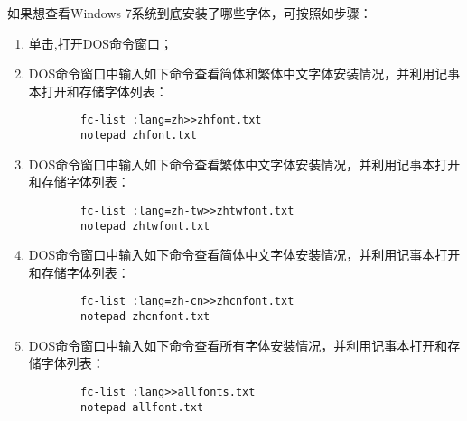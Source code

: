 如果想查看Windows 7系统到底安装了哪些字体，可按照如步骤：
\begin{enumerate}
	\item 单击,打开DOS命令窗口；
	\item DOS命令窗口中输入如下命令查看简体和繁体中文字体安装情况，并利用记事本打开和存储字体列表：
	\begin{lstlisting}
		fc-list :lang=zh>>zhfont.txt
		notepad zhfont.txt
	\end{lstlisting}
	\item DOS命令窗口中输入如下命令查看繁体中文字体安装情况，并利用记事本打开和存储字体列表：
	\begin{lstlisting}
		fc-list :lang=zh-tw>>zhtwfont.txt
		notepad zhtwfont.txt
	\end{lstlisting}
	\item DOS命令窗口中输入如下命令查看简体中文字体安装情况，并利用记事本打开和存储字体列表：
	\begin{lstlisting}
		fc-list :lang=zh-cn>>zhcnfont.txt
		notepad zhcnfont.txt
	\end{lstlisting}
	\item DOS命令窗口中输入如下命令查看所有字体安装情况，并利用记事本打开和存储字体列表：
	\begin{lstlisting}
		fc-list :lang>>allfonts.txt
		notepad allfont.txt
	\end{lstlisting}
\end{enumerate}
